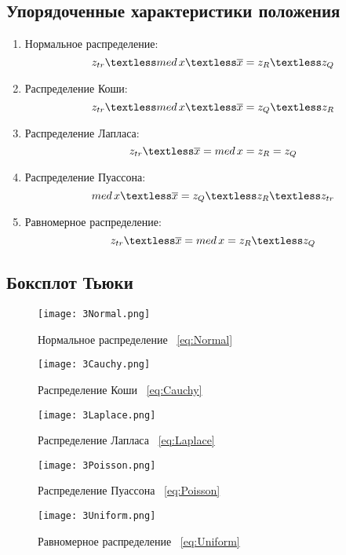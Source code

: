 \documentclass[12pt,a4paper]{scrartcl}
\begin{document}
\subsection{Упорядоченные характеристики положения}
\begin{enumerate}
\item Нормальное распределение:
\begin{equation}
\centering
z_{tr} \textless med \, x \textless \overline x= z_R \textless z_Q
\end{equation}

\item Распределение Коши:
\begin{equation}
\centering
z_{tr} \textless med \, x \textless \overline x = z_Q \textless z_R
\end{equation}

\item Распределение Лапласа:
\begin{equation}
\centering
z_{tr} \textless \overline x = med \, x = z_R = z_Q
\end{equation}

\item Распределение Пуассона:
\begin{equation}
\centering
med \, x \textless \overline x = z_Q \textless z_R \textless z_{tr}
\end{equation}

\item Равномерное распределение:
\begin{equation}
\centering
z_{tr} \textless \overline x = med \, x = z_R \textless z_Q
\end{equation}
\end{enumerate}

\subsection{Боксплот Тьюки}
\begin{figure}[H]
  \centering
  \texttt{[image: 3Normal.png]}
  \caption{Нормальное распределение ~\eqref{eq:Normal}}
 
\end{figure}
\begin{figure}[H]
  \centering
  \texttt{[image: 3Cauchy.png]}
  \caption{Распределение Коши ~\eqref{eq:Cauchy}}
\end{figure}
\begin{figure}[H]
\centering
  \texttt{[image: 3Laplace.png]}
  \caption{Распределение Лапласа ~\eqref{eq:Laplace}}
\end{figure}
\begin{figure}[H]
  \centering
  \texttt{[image: 3Poisson.png]}
  \caption{Распределение Пуассона ~\eqref{eq:Poisson}}
\end{figure}
\begin{figure}[H]
  \centering
  \texttt{[image: 3Uniform.png]}
  \caption{Равномерное распределение ~\eqref{eq:Uniform}}
\end{figure}
\end{document}
